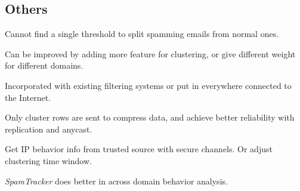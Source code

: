 \documentclass[]{article}
\begin{document}
\subsection{Others}
Cannot find a single threshold to split spamming emails from normal
ones.

Can be improved by adding more feature for clustering, or give different
weight for different domains.

Incorporated with existing filtering systems or put in everywhere connected
to the Internet.

Only cluster rows are sent to compress data, and achieve better reliability
with replication and anycast.

Get IP behavior info from trusted source with secure channels. Or adjust
clustering time window.

\textit{SpamTracker} does better in across domain behavior analysis.
\end{document}

